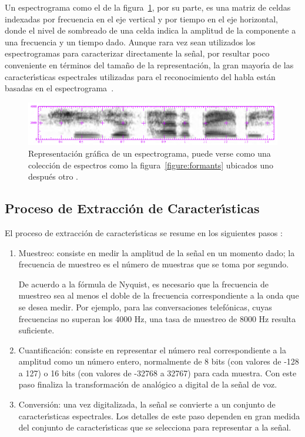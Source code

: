 Un espectrograma como el de la figura~\ref{figure:spectrogram}, por su parte, es una matriz de celdas indexadas por
frecuencia en el eje vertical y por tiempo en el eje 
horizontal, donde el nivel de sombreado de una celda indica la amplitud de la componente a una frecuencia y un tiempo 
dado. Aunque rara vez sean utilizados los espectrogramas para caracterizar directamente la se\~nal,
por resultar poco conveniente en t\'erminos del tama\~no de la representaci\'on,
la gran mayor{\'\i}a de las caracter{\'\i}sticas espectrales utilizadas para el reconocimiento del 
habla est\'an basadas en el \mbox{espectrograma \cite{Ellis08anintroduction}}.

\begin{figure}[H]
\centering
\includegraphics[width=0.9\linewidth]{./graphics/spectrogram.png}
\caption{Representaci\'on gr\'afica de un espectrograma, puede verse como una colecci\'on de espectros como la 
    figura~\ref{figure:formants} ubicados uno despu\'es otro \cite{Jurafsky}.}
\label{figure:spectrogram}
\end{figure}

\subsection{Proceso de Extracci\'on de Caracter{\'\i}sticas}
El proceso de extracci\'on de caracter{\'\i}sticas se resume en los siguientes 
pasos \cite{Jurafsky}:

\begin{enumerate}
\item Muestreo: consiste en medir la amplitud de la se\~nal en un momento dado; la frecuencia 
de muestreo es el n\'umero de muestras que se toma por segundo. 

De acuerdo a la f\'ormula de Nyquist, es necesario que la frecuencia de muestreo sea al menos el 
doble de la frecuencia correspondiente a la onda que se desea medir. Por ejemplo, para las 
conversaciones telef\'onicas, cuyas frecuencias no superan los 4000 Hz, una tasa de muestreo 
de 8000 Hz resulta suficiente.

\item Cuantificaci\'on: consiste en representar el n\'umero real correspondiente a la amplitud 
como un n\'umero entero, normalmente de 8 bits (con valores de -128 a 127) o 16 bits (con valores de -32768 a 32767) para cada muestra. 
Con este paso finaliza la transformaci\'on de anal\'ogico a digital de la se\~nal de voz.

\item Conversi\'on: una vez digitalizada, la se\~nal se convierte a un conjunto de caracter{\'\i}sticas espectrales. Los detalles de este 
paso dependen en gran medida del conjunto de caracter{\'\i}sticas que se selecciona para representar a la se\~nal.

\end{enumerate}

